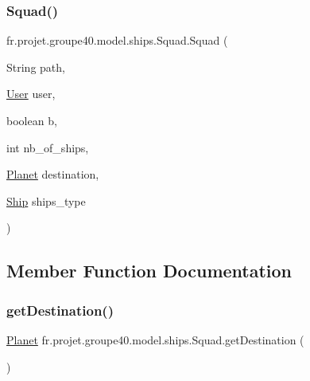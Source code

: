 \mbox{\label{classfr_1_1projet_1_1groupe40_1_1model_1_1ships_1_1_squad_a7221e4325db91f455b59652d047cddac}} 
\subsubsection{\texorpdfstring{Squad()}{Squad()}\hspace{0.1cm}{\footnotesize\ttfamily [2/2]}}
{\footnotesize\ttfamily fr.\+projet.\+groupe40.\+model.\+ships.\+Squad.\+Squad (\begin{DoxyParamCaption}\item[{String}]{path,  }\item[{\hyperlink{classfr_1_1projet_1_1groupe40_1_1client_1_1_user}{User}}]{user,  }\item[{boolean}]{b,  }\item[{int}]{nb\+\_\+of\+\_\+ships,  }\item[{\hyperlink{classfr_1_1projet_1_1groupe40_1_1model_1_1board_1_1_planet}{Planet}}]{destination,  }\item[{\hyperlink{classfr_1_1projet_1_1groupe40_1_1model_1_1ships_1_1_ship}{Ship}}]{ships\+\_\+type }\end{DoxyParamCaption})}



\subsection{Member Function Documentation}
\mbox{\label{classfr_1_1projet_1_1groupe40_1_1model_1_1ships_1_1_squad_aa5362a9a9f99f3e9e43a4421bf78792c}} 
\subsubsection{\texorpdfstring{get\+Destination()}{getDestination()}}
{\footnotesize\ttfamily \hyperlink{classfr_1_1projet_1_1groupe40_1_1model_1_1board_1_1_planet}{Planet} fr.\+projet.\+groupe40.\+model.\+ships.\+Squad.\+get\+Destination (\begin{DoxyParamCaption}{ }\end{DoxyParamCaption})}

